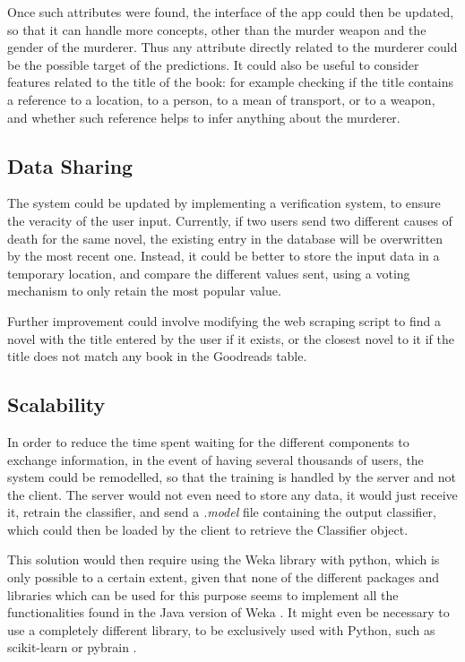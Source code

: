 \documentclass{mproj}
\begin{document}
Once such attributes were found, the interface of the app could then be updated, so that it can handle more concepts, other than the murder weapon and the gender of the murderer. Thus any attribute directly related to the murderer could be the possible target of the predictions.
It could also be useful to consider features related to the title of the book: for example checking if the title contains a reference to a location, to a person, to a mean of transport, or to a weapon, and whether such reference helps to infer anything about the murderer.
	
\subsection*{Data Sharing}

The system could be updated by implementing a verification system, to ensure the veracity of the user input. Currently, if two users send two different causes of death for the same novel, the existing entry in the database will be overwritten by the most recent one. Instead, it could be better to store the input data in a temporary location, and compare the different values sent, using a voting mechanism to only retain the most popular value.

Further improvement could involve modifying the web scraping script to find a novel with the title entered by the user if it exists, or the closest novel to it if the title does not match any book in the Goodreads table.

\subsection*{Scalability}

In order to reduce the time spent waiting for the different components to exchange information, in the event of having several thousands of users, the system could be remodelled, so that the training is handled by the server and not the client. The server would not even need to store any data, it would just receive it, retrain the classifier, and send a \textit{.model} file containing the output classifier, which could then be loaded by the client to retrieve the Classifier object. \par

This solution would then require using the Weka library with python, which is only possible to a certain extent, given that none of the different packages and libraries which can be used for this purpose seems to implement all the functionalities found in the Java version of Weka \cite{wekapython}. It might even be necessary to use a completely different library, to be exclusively used with Python, such as scikit-learn \cite{scikit-learn} or pybrain \cite{pybrain}. \par
\end{document}
